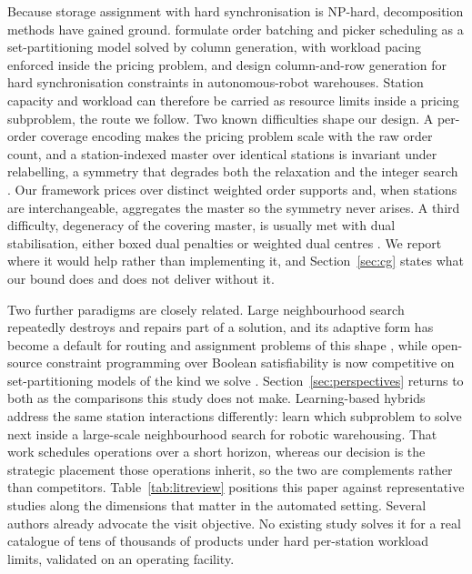 \documentclass[]{interact}
\begin{document}
Because storage assignment with hard synchronisation is NP-hard, decomposition methods have gained ground. \citet{muter2022} formulate order batching and picker scheduling as a set-partitioning model solved by column generation, with workload pacing enforced inside the pricing problem, and \citet{zhen2025} design column-and-row generation for hard synchronisation constraints in autonomous-robot warehouses. Station capacity and workload can therefore be carried as resource limits inside a pricing subproblem, the route we follow. Two known difficulties shape our design. A per-order coverage encoding makes the pricing problem scale with the raw order count, and a station-indexed master over identical stations is invariant under relabelling, a symmetry that degrades both the relaxation and the integer search \citep{vanderbeck2000dw}. Our framework prices over distinct weighted order supports and, when stations are interchangeable, aggregates the master so the symmetry never arises. A third difficulty, degeneracy of the covering master, is usually met with dual stabilisation, either boxed dual penalties \citep{dumerle1999stabilized} or weighted dual centres \citep{wentges1997weighted}. We report where it would help rather than implementing it, and Section~\ref{sec:cg} states what our bound does and does not deliver without it.

Two further paradigms are closely related. Large neighbourhood search repeatedly destroys and repairs part of a solution, and its adaptive form has become a default for routing and assignment problems of this shape \citep{ropke2006alns, pisinger2010lns}, while open-source constraint programming over Boolean satisfiability is now competitive on set-partitioning models of the kind we solve \citep{perron2023cpsat}. Section~\ref{sec:perspectives} returns to both as the comparisons this study does not make. Learning-based hybrids address the same station interactions differently: \citet{barnhart2024learnthenoptimize} learn which subproblem to solve next inside a large-scale neighbourhood search for robotic warehousing. That work schedules operations over a short horizon, whereas our decision is the strategic placement those operations inherit, so the two are complements rather than competitors. Table~\ref{tab:litreview} positions this paper against representative studies along the dimensions that matter in the automated setting. Several authors already advocate the visit objective. No existing study solves it for a real catalogue of tens of thousands of products under hard per-station workload limits, validated on an operating facility.
\end{document}
